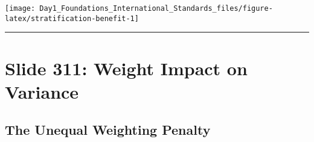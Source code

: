 \documentclass[
]{article}
\begin{document}
\texttt{[image: Day1\_Foundations\_International\_Standards\_files/figure-latex/stratification-benefit-1]}

\begin{center}\rule{0.5\linewidth}{0.5pt}\end{center}

\section{Slide 311: Weight Impact on
Variance}\label{slide-311-weight-impact-on-variance}

\subsection{The Unequal Weighting
Penalty}\label{the-unequal-weighting-penalty}
\end{document}
